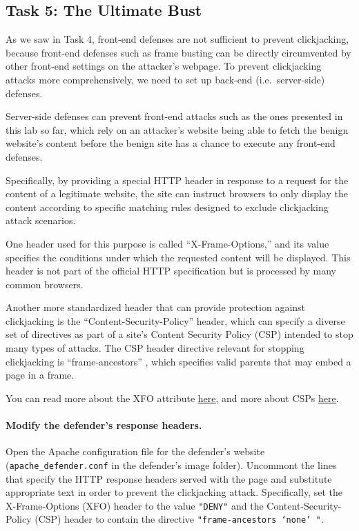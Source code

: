 
\subsection{Task 5: The Ultimate Bust}
As we saw in Task 4, front-end defenses are not sufficient to prevent
clickjacking, because front-end defenses such as frame busting can be
directly circumvented by other front-end settings on the attacker's
webpage. To prevent clickjacking attacks more comprehensively, we need
to set up back-end (i.e.\ server-side) defenses.

Server-side defenses can prevent front-end attacks such as the ones
presented in this lab so far, which rely on an attacker's website being
able to fetch the benign website's content before the benign site has a
chance to execute any front-end defenses. 

Specifically, by providing a special HTTP header in response to a
request for the content of a legitimate website, the site can instruct
browsers to only display the content according to specific matching
rules designed to exclude clickjacking attack scenarios.

One header used for this purpose is called ``X-Frame-Options,'' and its
value specifies the conditions under which the requested content will be
displayed.  This header is not part of the official HTTP specification
but is processed by many common browsers.

Another more standardized header that can provide protection against
clickjacking is the ``Content-Security-Policy'' header, which can
specify a diverse set of directives as part of a site's Content Security
Policy (CSP) intended to stop many types of attacks.  The CSP header
directive relevant for stopping clickjacking is ``frame-ancestors'' ,
which specifies valid parents that may embed a page in a frame.

You can read more about the XFO attribute
\underline{\href{https://developer.mozilla.org/en-US/docs/Web/HTTP/Headers/X-Frame-Options}{here}},
and more about CSPs
\underline{\href{https://developer.mozilla.org/en-US/docs/Web/HTTP/CSP}{here}}.

\paragraph{Modify the defender's response headers.} Open the Apache
configuration file for the defender's website
(\texttt{apache\_defender.conf} in the defender's image folder).
Uncommont the lines that specify the HTTP response headers served with
the page and substitute appropriate text in order to prevent the
clickjacking attack.  Specifically, set the X-Frame-Options (XFO) header
to the value \texttt{"DENY"} and the Content-Security-Policy (CSP)
header to contain the directive \texttt{"frame-ancestors `none' "}.

